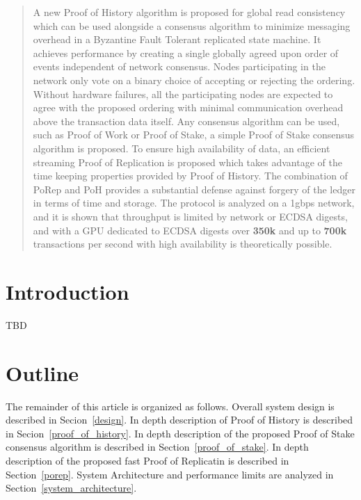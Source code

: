 \documentclass[12pt]{article}
\begin{document}
\maketitle

\begin{abstract}
A new Proof of History algorithm is proposed for global read consistency which can be used alongside a consensus algorithm to minimize messaging overhead in a Byzantine Fault Tolerant replicated state machine. It achieves performance by creating a single globally agreed upon order of events independent of network consensus. Nodes participating in the network only vote on a binary choice of accepting or rejecting the ordering. Without hardware failures, all the participating nodes are expected to agree with the proposed ordering with minimal communication overhead above the transaction data itself. Any consensus algorithm can be used, such as Proof of Work or Proof of Stake, a simple Proof of Stake consensus algorithm is proposed. To ensure high availability of data, an efficient streaming Proof of Replication is proposed which takes advantage of the time keeping properties provided by Proof of History.  The combination of PoRep and PoH provides a substantial defense against forgery of the ledger in terms of time and storage. The protocol is analyzed on a 1gbps network, and it is shown that throughput is limited by network or ECDSA digests, and with a GPU dedicated to ECDSA digests over \textbf{350k} and up to \textbf{700k} transactions per second with high availability is theoretically possible.

\end{abstract}

\section{Introduction}
TBD
\section{Outline}
The remainder of this article is organized as follows. Overall system design is described in Secion~\ref{design}. In depth description of Proof of History is described in Secion~\ref{proof_of_history}. In depth description of the proposed Proof of Stake consensus algorithm is described in Section~\ref{proof_of_stake}.  In depth description of the proposed fast Proof of Replicatin is described in Section~\ref{porep}. System Architecture and performance limits are analyzed in Section~\ref{system_architecture}.
\end{document}
